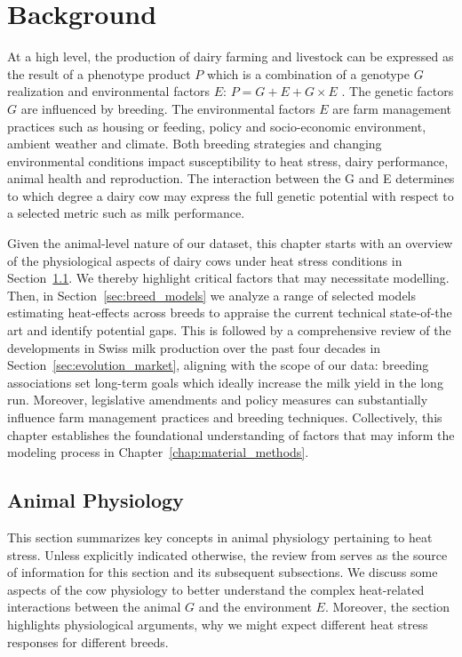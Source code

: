 \chapter{Background}\label{chap:background}
At a high level, the production of dairy farming and livestock can be expressed as the result of a phenotype product $P$ which is a combination of a genotype $G$ realization and environmental factors $E$: $P = G + E + G \times E$ \citep{adhikari_climate_2022}. The genetic factors $G$ are influenced by breeding. The environmental factors $E$ are farm management practices such as housing or feeding, policy and socio-economic environment, ambient weather and climate. Both breeding strategies and changing environmental conditions impact susceptibility to heat stress, dairy performance, animal health and reproduction. The interaction between the G and E determines to which degree a dairy cow may express the full genetic potential with respect to a selected metric such as milk performance.

\vspace*{\baselineskip}
Given the animal-level nature of our dataset, this chapter starts with an overview of the physiological aspects of dairy cows under heat stress conditions in Section~\ref{sec:animal_physiology}. We thereby highlight critical factors that may necessitate modelling. Then, in Section~\ref{sec:breed_models} we analyze a range of selected models estimating heat-effects across breeds to appraise the current technical state-of-the art and identify potential gaps. This is followed by a comprehensive review of the developments in Swiss milk production over the past four decades in Section~\ref{sec:evolution_market}, aligning with the scope of our data: breeding associations set long-term goals which ideally increase the milk yield in the long run. Moreover, legislative amendments and policy measures can substantially influence farm management practices and breeding techniques. Collectively, this chapter establishes the foundational understanding of factors that may inform the modeling process in Chapter~\ref{chap:material_methods}.

\newpage

\section{Animal Physiology}\label{sec:animal_physiology}
This section summarizes key concepts in animal physiology pertaining to heat stress. Unless explicitly indicated otherwise, the review from \cite{kadzere_heat_2002} serves as the source of information for this section and its subsequent subsections. We discuss some aspects of the cow physiology to better understand the complex heat-related interactions between the animal $G$ and the environment $E$. Moreover, the section highlights physiological arguments, why we might expect different heat stress responses for different breeds.



